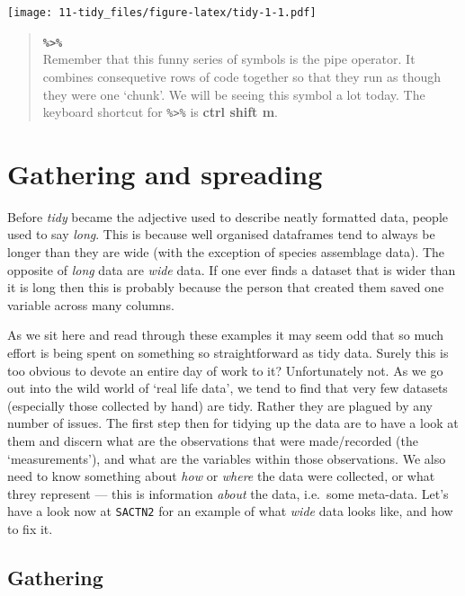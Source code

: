 \documentclass[
]{book}
\begin{document}
\texttt{[image: 11-tidy\_files/figure-latex/tidy-1-1.pdf]}

\begin{quote}
\textbf{\texttt{\%\textgreater{}\%}}~\\
Remember that this funny series of symbols is the pipe operator. It combines consequetive rows of code together so that they run as though they were one `chunk'. We will be seeing this symbol a lot today. The keyboard shortcut for \texttt{\%\textgreater{}\%} is \textbf{ctrl shift m}.
\end{quote}

\hypertarget{gathering-and-spreading}{%
\section{Gathering and spreading}\label{gathering-and-spreading}}

Before \emph{tidy} became the adjective used to describe neatly formatted data, people used to say \emph{long}. This is because well organised dataframes tend to always be longer than they are wide (with the exception of species assemblage data). The opposite of \emph{long} data are \emph{wide} data. If one ever finds a dataset that is wider than it is long then this is probably because the person that created them saved one variable across many columns.

As we sit here and read through these examples it may seem odd that so much effort is being spent on something so straightforward as tidy data. Surely this is too obvious to devote an entire day of work to it? Unfortunately not. As we go out into the wild world of `real life data', we tend to find that very few datasets (especially those collected by hand) are tidy. Rather they are plagued by any number of issues. The first step then for tidying up the data are to have a look at them and discern what are the observations that were made/recorded (the `measurements'), and what are the variables within those observations. We also need to know something about \emph{how} or \emph{where} the data were collected, or what threy represent --- this is information \emph{about} the data, i.e.~some meta-data. Let's have a look now at \texttt{SACTN2} for an example of what \emph{wide} data looks like, and how to fix it.

\hypertarget{gathering}{%
\subsection{Gathering}\label{gathering}}
\end{document}
